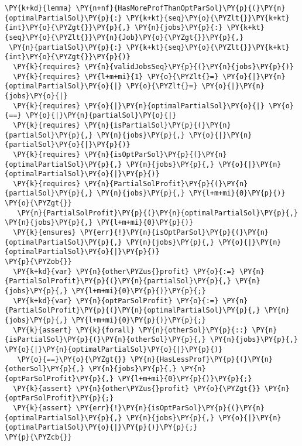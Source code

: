 \begin{Verbatim}[commandchars=\\\{\},fontsize=\footnotesize]
\PY{k+kd}{lemma} \PY{n+nf}{HasMoreProfThanOptParSol}\PY{p}{(}\PY{n}{optimalPartialSol}\PY{p}{:} \PY{k+kt}{seq}\PY{o}{\PYZlt{}}\PY{k+kt}{int}\PY{o}{\PYZgt{}}\PY{p}{,} \PY{n}{jobs}\PY{p}{:} \PY{k+kt}{seq}\PY{o}{\PYZlt{}}\PY{n}{Job}\PY{o}{\PYZgt{}}\PY{p}{,}
 \PY{n}{partialSol}\PY{p}{:} \PY{k+kt}{seq}\PY{o}{\PYZlt{}}\PY{k+kt}{int}\PY{o}{\PYZgt{}}\PY{p}{)}
  \PY{k}{requires} \PY{n}{validJobsSeq}\PY{p}{(}\PY{n}{jobs}\PY{p}{)}
  \PY{k}{requires} \PY{l+m+mi}{1} \PY{o}{\PYZlt{}=} \PY{o}{|}\PY{n}{optimalPartialSol}\PY{o}{|} \PY{o}{\PYZlt{}=} \PY{o}{|}\PY{n}{jobs}\PY{o}{|}
  \PY{k}{requires} \PY{o}{|}\PY{n}{optimalPartialSol}\PY{o}{|} \PY{o}{==} \PY{o}{|}\PY{n}{partialSol}\PY{o}{|}
  \PY{k}{requires} \PY{n}{isPartialSol}\PY{p}{(}\PY{n}{partialSol}\PY{p}{,} \PY{n}{jobs}\PY{p}{,} \PY{o}{|}\PY{n}{partialSol}\PY{o}{|}\PY{p}{)}
  \PY{k}{requires} \PY{n}{isOptParSol}\PY{p}{(}\PY{n}{optimalPartialSol}\PY{p}{,} \PY{n}{jobs}\PY{p}{,} \PY{o}{|}\PY{n}{optimalPartialSol}\PY{o}{|}\PY{p}{)}
  \PY{k}{requires} \PY{n}{PartialSolProfit}\PY{p}{(}\PY{n}{partialSol}\PY{p}{,} \PY{n}{jobs}\PY{p}{,} \PY{l+m+mi}{0}\PY{p}{)} \PY{o}{\PYZgt{}}
   \PY{n}{PartialSolProfit}\PY{p}{(}\PY{n}{optimalPartialSol}\PY{p}{,} \PY{n}{jobs}\PY{p}{,} \PY{l+m+mi}{0}\PY{p}{)}
  \PY{k}{ensures} \PY{err}{!}\PY{n}{isOptParSol}\PY{p}{(}\PY{n}{optimalPartialSol}\PY{p}{,} \PY{n}{jobs}\PY{p}{,} \PY{o}{|}\PY{n}{optimalPartialSol}\PY{o}{|}\PY{p}{)}
\PY{p}{\PYZob{}}
  \PY{k+kd}{var} \PY{n}{other\PYZus{}profit} \PY{o}{:=} \PY{n}{PartialSolProfit}\PY{p}{(}\PY{n}{partialSol}\PY{p}{,} \PY{n}{jobs}\PY{p}{,} \PY{l+m+mi}{0}\PY{p}{)}\PY{p}{;}
  \PY{k+kd}{var} \PY{n}{optParSolProfit} \PY{o}{:=} \PY{n}{PartialSolProfit}\PY{p}{(}\PY{n}{optimalPartialSol}\PY{p}{,} \PY{n}{jobs}\PY{p}{,} \PY{l+m+mi}{0}\PY{p}{)}\PY{p}{;}
  \PY{k}{assert} \PY{k}{forall} \PY{n}{otherSol}\PY{p}{::} \PY{n}{isPartialSol}\PY{p}{(}\PY{n}{otherSol}\PY{p}{,} \PY{n}{jobs}\PY{p}{,} \PY{o}{|}\PY{n}{optimalPartialSol}\PY{o}{|}\PY{p}{)} 
   \PY{o}{==}\PY{o}{\PYZgt{}} \PY{n}{HasLessProf}\PY{p}{(}\PY{n}{otherSol}\PY{p}{,} \PY{n}{jobs}\PY{p}{,} \PY{n}{optParSolProfit}\PY{p}{,} \PY{l+m+mi}{0}\PY{p}{)}\PY{p}{;}
  \PY{k}{assert} \PY{n}{other\PYZus{}profit} \PY{o}{\PYZgt{}} \PY{n}{optParSolProfit}\PY{p}{;}
  \PY{k}{assert} \PY{err}{!}\PY{n}{isOptParSol}\PY{p}{(}\PY{n}{optimalPartialSol}\PY{p}{,} \PY{n}{jobs}\PY{p}{,} \PY{o}{|}\PY{n}{optimalPartialSol}\PY{o}{|}\PY{p}{)}\PY{p}{;}
\PY{p}{\PYZcb{}}
\end{Verbatim}

